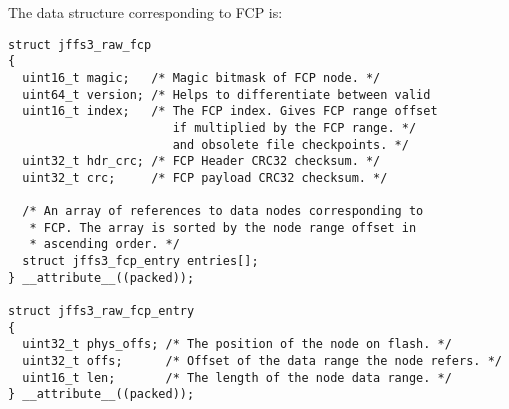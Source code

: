 \documentclass[12pt,a4paper,oneside,titlepage]{article}
\begin{document}
The data structure corresponding to FCP is:
\begin{verbatim}
struct jffs3_raw_fcp
{
  uint16_t magic;   /* Magic bitmask of FCP node. */
  uint64_t version; /* Helps to differentiate between valid
  uint16_t index;   /* The FCP index. Gives FCP range offset
                       if multiplied by the FCP range. */
                       and obsolete file checkpoints. */
  uint32_t hdr_crc; /* FCP Header CRC32 checksum. */
  uint32_t crc;     /* FCP payload CRC32 checksum. */

  /* An array of references to data nodes corresponding to
   * FCP. The array is sorted by the node range offset in
   * ascending order. */
  struct jffs3_fcp_entry entries[];
} __attribute__((packed));

struct jffs3_raw_fcp_entry
{
  uint32_t phys_offs; /* The position of the node on flash. */
  uint32_t offs;      /* Offset of the data range the node refers. */
  uint16_t len;       /* The length of the node data range. */
} __attribute__((packed));
\end{verbatim}
\end{document}
